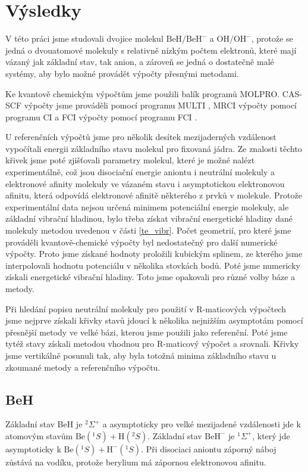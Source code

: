 \chapter{Výsledky}
V této práci jsme studovali dvojice molekul $\mathrm{BeH/BeH^-}$ a $\mathrm{OH/OH^-}$, protože se jedná o dvouatomové molekuly s relativně nízkým počtem elektronů,
které mají vázaný jak základní stav, tak anion, a zároveň se jedná o 
dostatečně malé systémy, aby bylo možné provádět výpočty přesnými metodami.

Ke kvantově chemickým výpočtům jsme použili balík programů
MOLPRO\cite{MOLPRO-WIREs, MOLPRO}.
CAS-SCF výpočty jsme prováděli pomocí programu MULTI \cite{WK85,KW85}, MRCI výpočty 
pomocí programu CI \cite{KW92} a FCI výpočty pomocí programu FCI \cite{KH84,KH89}.

U referenčních výpočtů jsme pro několik desítek mezijaderných vzdálenost vypočítali 
energii základního stavu molekul pro fixovaná jádra. Ze znalosti těchto křivek jsme 
poté zjišťovali parametry molekul, které je 
možné nalézt experimentálně, což jsou disociační energie aniontu i neutrální molekuly 
a 
elektronové afinity molekuly  ve vázaném stavu i asymptotickou elektronovou afinitu, 
která odpovídá 
elektronové afinitě některého z prvků v molekule. Protože experimentální 
data nejsou určená minimem potenciální energie molekuly, ale základní vibrační 
hladinou, bylo třeba získat vibrační energetické hladiny dané molekuly metodou uvedenou 
v části \ref{te_vibr}. Počet geometrií, pro které jsme 
prováděli kvantově-chemické výpočty byl nedostatečný pro další numerické výpočty. Proto 
jsme získané hodnoty proložili kubickým splinem, ze kterého jsme
interpolovali hodnotu potenciálu v několika stovkách bodů. Poté jsme numericky získali 
energetické vibrační hladiny. Toto jsme opakovali pro různé volby báze a metody.

Při hledání popisu neutrální molekuly pro použití v R-maticových výpočtech jsme nejprve 
získali křivky stavů jdoucí 
k několika nejnižším asymptotám pomocí přesnější metody ve velké bázi, kterou jsme 
použili jako referenční. Poté jsme tytéž stavy získali metodou vhodnou pro R-maticový 
výpočet a srovnali. Křivky jsme vertikálně posunuli tak, aby byla 
totožná minima základního stavu u zkoumané metody a referenčního výpočtu.

\section{BeH}
Základní stav BeH je $^2\Sigma^+$ a asymptoticky pro velké mezijadené vzdálenosti jde k 
atomovým stavům $\mathrm{Be}(^1S) + \mathrm{H}(^2S)$. Základní stav $\mathrm{BeH}^-$ je 
$^1\Sigma^+$, který jde asymptoticky k $\mathrm{Be}(^1S) + \mathrm{H^-}(^1S)$.
Při disociaci aniontu záporný náboj zůstává na vodíku, protože berylium má 
zápornou elektronovou afinitu.

